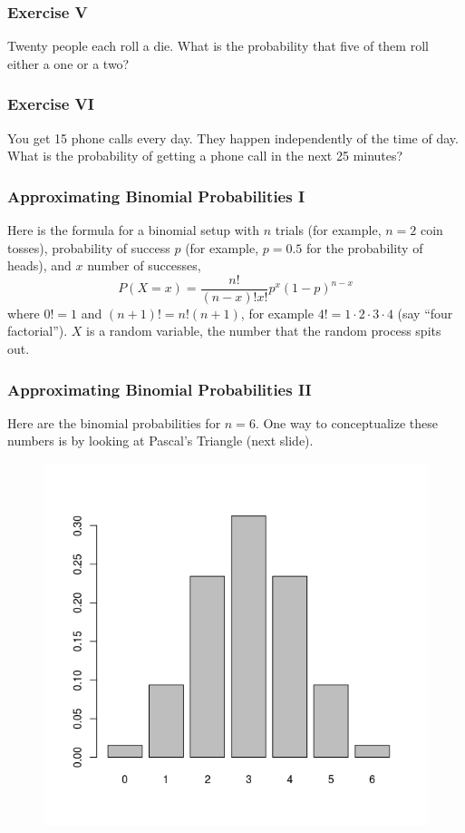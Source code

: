 \documentclass[xcolor=dvipsnames]{beamer}
\begin{document}
\begin{frame}
  \frametitle{Exercise V}
  {\ubung} Twenty people each roll a die. What is the probability that
  five of them roll either a one or a two?
\end{frame}

\begin{frame}
  \frametitle{Exercise VI} {\ubung} You get 15 phone calls every day.
  They happen independently of the time of day. What is the
  probability of getting a phone call in the next 25 minutes?
\end{frame}

\begin{frame}
  \frametitle{Approximating Binomial Probabilities I}
Here is the formula for a \alert{binomial} setup with $n$ trials (for example,
$n=2$ coin tosses), probability of success $p$ (for example, $p=0.5$ for the
probability of heads), and $x$ number of successes,
\begin{equation}
  \label{eq:iedohdah}
  P(X=x)=\frac{n!}{(n-x)!x!}p^{x}(1-p)^{n-x}
\end{equation}
where $0!=1$ and $(n+1)!=n!(n+1)$, for example
$4!=1\cdot{}2\cdot{}3\cdot{}4$ (say ``four factorial''). $X$ is a
\alert{random variable}, the number that the random process spits out.
\end{frame}

\begin{frame}
  \frametitle{Approximating Binomial Probabilities II}
Here are the binomial probabilities for $n=6$. One way to
conceptualize these numbers is by looking at Pascal's Triangle (next
slide). 
  \begin{figure}[h]
    \includegraphics[scale=.5]{./diagrams/binomial1.png}
  \end{figure}
\end{frame}
\end{document}
